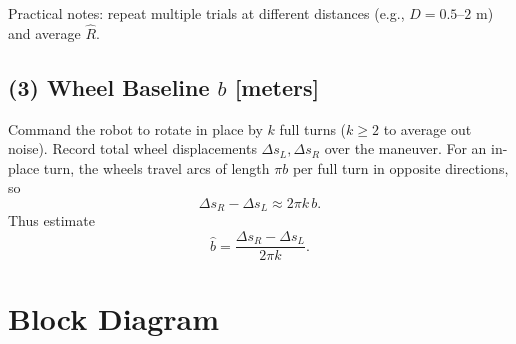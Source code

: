 \documentclass[11pt]{article}
\begin{document}
Practical notes: repeat multiple trials at different distances (e.g., $D=0.5$--$2$ m) and average $\hat{R}$.

\subsection*{(3) Wheel Baseline $b$ [meters]}

Command the robot to rotate in place by $k$ full turns ($k\ge 2$ to average out noise).
Record total wheel displacements $\Delta s_L,\Delta s_R$ over the maneuver.
For an in-place turn, the wheels travel arcs of length $\pi b$ per full turn in opposite directions, so
\begin{equation}
\Delta s_R - \Delta s_L \approx 2\pi k\,b.
\end{equation}
Thus estimate
\begin{equation}
\hat{b} = \frac{\Delta s_R - \Delta s_L}{2\pi k}.
\end{equation}

\section*{Block Diagram}

\begin{center}
\end{center}
\end{document}
